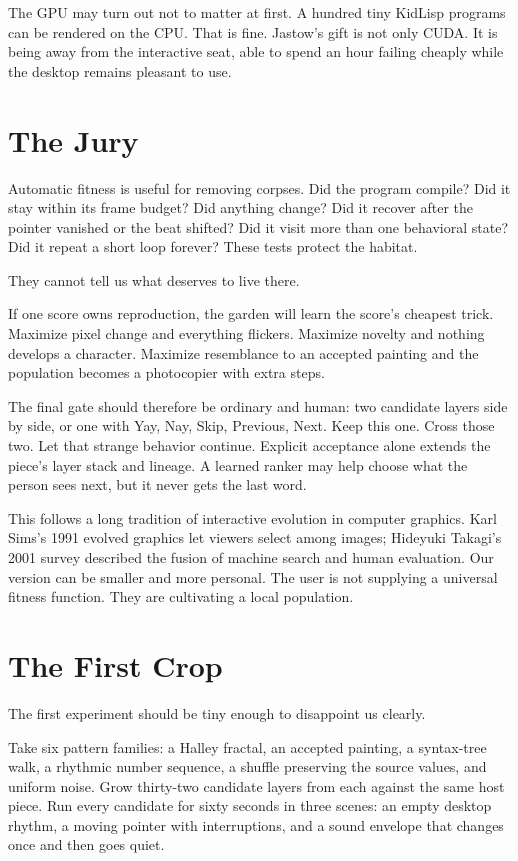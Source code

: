 \documentclass[10pt,letterpaper]{article}
\begin{document}
The GPU may turn out not to matter at first. A hundred tiny KidLisp programs can be rendered on the CPU. That is fine. Jastow's gift is not only CUDA. It is being away from the interactive seat, able to spend an hour failing cheaply while the desktop remains pleasant to use.

\section{The Jury}

Automatic fitness is useful for removing corpses. Did the program compile? Did it stay within its frame budget? Did anything change? Did it recover after the pointer vanished or the beat shifted? Did it visit more than one behavioral state? Did it repeat a short loop forever? These tests protect the habitat.

They cannot tell us what deserves to live there.

If one score owns reproduction, the garden will learn the score's cheapest trick. Maximize pixel change and everything flickers. Maximize novelty and nothing develops a character. Maximize resemblance to an accepted painting and the population becomes a photocopier with extra steps.

The final gate should therefore be ordinary and human: two candidate layers side by side, or one with Yay, Nay, Skip, Previous, Next. Keep this one. Cross those two. Let that strange behavior continue. Explicit acceptance alone extends the piece's layer stack and lineage. A learned ranker may help choose what the person sees next, but it never gets the last word.

This follows a long tradition of interactive evolution in computer graphics. Karl Sims's 1991 evolved graphics let viewers select among images; Hideyuki Takagi's 2001 survey described the fusion of machine search and human evaluation. Our version can be smaller and more personal. The user is not supplying a universal fitness function. They are cultivating a local population.

\section{The First Crop}

The first experiment should be tiny enough to disappoint us clearly.

Take six pattern families: a Halley fractal, an accepted painting, a syntax-tree walk, a rhythmic number sequence, a shuffle preserving the source values, and uniform noise. Grow thirty-two candidate layers from each against the same host piece. Run every candidate for sixty seconds in three scenes: an empty desktop rhythm, a moving pointer with interruptions, and a sound envelope that changes once and then goes quiet.
\end{document}
